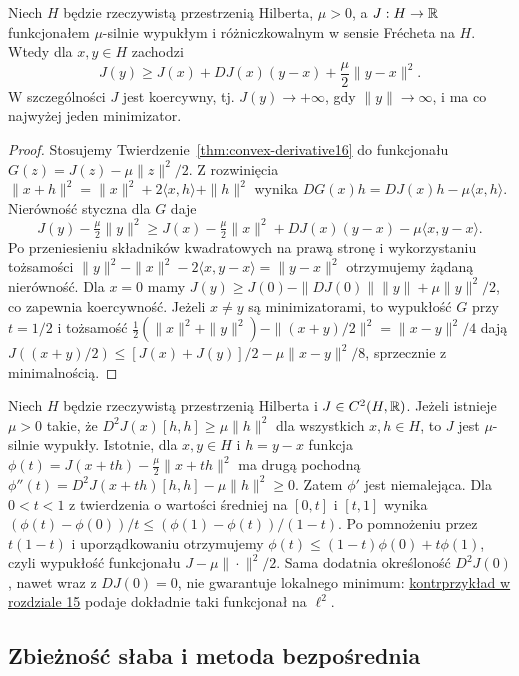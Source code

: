 \begin{stwierdzenie}
\label{prop:strong-coercive16}
Niech $H$ będzie rzeczywistą przestrzenią Hilberta,
$\mu>0$, a $J:H\to\mathbb R$ funkcjonałem $\mu$-silnie wypukłym
i różniczkowalnym w sensie Frécheta na $H$. Wtedy dla $x,y\in H$
zachodzi
\[
J(y)\ge J(x)+DJ(x)(y-x)+\frac\mu2\|y-x\|^2.
\]
W szczególności $J$ jest koercywny, tj.
$J(y)\to+\infty$, gdy $\|y\|\to\infty$,
i ma co najwyżej jeden minimizator.
\end{stwierdzenie}
\begin{proof}
Stosujemy Twierdzenie~\ref{thm:convex-derivative16}
do funkcjonału $G(z)=J(z)-\mu\|z\|^2/2$.
Z rozwinięcia
$\|x+h\|^2=\|x\|^2+2\langle x,h\rangle+\|h\|^2$
wynika $DG(x)h=DJ(x)h-\mu\langle x,h\rangle$.
Nierówność styczna dla $G$ daje
\[
 J(y)-\tfrac\mu2\|y\|^2
 \ge J(x)-\tfrac\mu2\|x\|^2
       +DJ(x)(y-x)-\mu\langle x,y-x\rangle .
\]
Po przeniesieniu składników kwadratowych na prawą stronę
i wykorzystaniu tożsamości
$\|y\|^2-\|x\|^2-2\langle x,y-x\rangle=\|y-x\|^2$
otrzymujemy żądaną nierówność.
Dla $x=0$ mamy
$J(y)\ge J(0)-\|DJ(0)\|\|y\|+\mu\|y\|^2/2$,
co zapewnia koercywność. Jeżeli $x\ne y$ są minimizatorami,
to wypukłość $G$ przy $t=1/2$ i tożsamość
$\tfrac12(\|x\|^2+\|y\|^2)-\|(x+y)/2\|^2
=\|x-y\|^2/4$ dają
$J((x+y)/2)\le [J(x)+J(y)]/2-\mu\|x-y\|^2/8$,
sprzecznie z minimalnością.
\end{proof}

\begin{przyklad}
\label{ex:variational-hessian16}
Niech $H$ będzie rzeczywistą przestrzenią Hilberta
i $J\in C^2(H,\mathbb R)$. Jeżeli istnieje $\mu>0$ takie, że
$D^2J(x)[h,h]\ge\mu\|h\|^2$ dla wszystkich $x,h\in H$,
to $J$ jest $\mu$-silnie wypukły.
Istotnie, dla $x,y\in H$ i $h=y-x$ funkcja
$\phi(t)=J(x+th)-\frac\mu2\|x+th\|^2$
ma drugą pochodną
$\phi''(t)=D^2J(x+th)[h,h]-\mu\|h\|^2\ge0$.
Zatem $\phi'$ jest niemalejąca. Dla $0<t<1$
z twierdzenia o wartości średniej na $[0,t]$ i $[t,1]$
wynika
$(\phi(t)-\phi(0))/t\le(\phi(1)-\phi(t))/(1-t)$.
Po pomnożeniu przez $t(1-t)$ i uporządkowaniu
otrzymujemy $\phi(t)\le(1-t)\phi(0)+t\phi(1)$,
czyli wypukłość funkcjonału $J-\mu\|\cdot\|^2/2$.
Sama dodatnia określoność $D^2J(0)$, nawet wraz
z $DJ(0)=0$, nie gwarantuje lokalnego minimum:
\hyperref[ex:positive-hessian15]{kontrprzykład w rozdziale 15}
podaje dokładnie taki funkcjonał na $\ell^2$.
\end{przyklad}

\subsection{Zbieżność słaba i metoda bezpośrednia}

